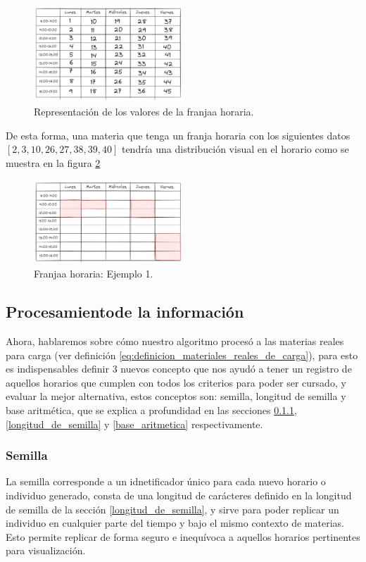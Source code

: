 \begin{figure}[h]
    \centering
    \includegraphics[width=0.5\textwidth]{images/franja-horaria.png}
    \caption{Representación de los valores de la franjaa horaria.}
    \label{fig:franja-horaria}
\end{figure}

De esta forma, una materia que tenga un franja horaria con los siguientes datos 
$[2, 3, 10, 26, 27, 38, 39, 40]$ tendría una distribución visual en el horario como se muestra en la figura \ref{fig:franja-horaria-caso}

\begin{figure}[h]
    \centering
    \includegraphics[width=0.5\textwidth]{images/franja-horaria-caso.png}
    \caption{Franjaa horaria: Ejemplo 1.}
    \label{fig:franja-horaria-caso}
\end{figure}

\subsection{Procesamientode la información} \label{procesamiento_de_la_informacion}
Ahora, hablaremos sobre cómo nuestro algoritmo procesó a las materias reales para carga (ver definición \ref{eq:definicion_materiales_reales_de_carga}), para esto es indispensables definir 3 nuevos concepto que nos ayudó a tener un registro de aquellos horarios que cumplen con todos los criterios para poder ser cursado, y evaluar la mejor alternativa, estos conceptos son: semilla, longitud de semilla y base aritmética, que se explica a profundidad en las secciones \ref{semilla}, \ref{longitud_de_semilla} y \ref{base_aritmetica} respectivamente.

\subsubsection{Semilla} \label{semilla}
La semilla corresponde a un idnetificador único para cada nuevo horario o individuo generado, consta de una longitud de carácteres definido en la longitud de semilla de la sección \ref{longitud_de_semilla}, y sirve para poder replicar un individuo en cualquier parte del tiempo y bajo el mismo contexto de materias. Esto permite replicar de forma seguro e inequívoca a aquellos horarios pertinentes para visualización.

